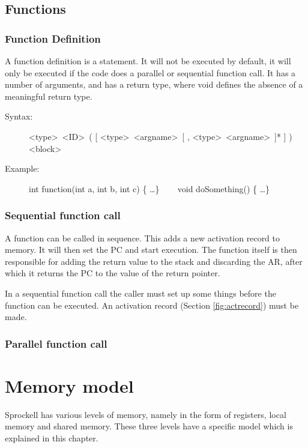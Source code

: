 \documentclass[10pt,a4paper]{report}
\begin{document}
\subsection{Functions} \label{subsec:functions}
\subsubsection{Function Definition}
A function definition is a statement. It will not be executed by default, it will only be executed if the code does a parallel or sequential function call. It has a number of arguments, and has a return type, where void defines the absence of a meaningful return 
type.

\begin{description}
	\item[Syntax:] 
		\textless type\textgreater ~\textless ID\textgreater ~( [ \textless type\textgreater ~\textless argname\textgreater ~[ , \textless type\textgreater ~\textless argname\textgreater ~]* ] ) \textless block\textgreater
	\item[Example:] 
		int function(int a, int b, int c) \{ \ldots \} ~~~
		void doSomething() \{ \ldots \}
\end{description} 



\subsubsection{Sequential function call}
A function can be called in sequence. This adds a new activation record to memory. It will then set the PC and start execution. The function itself is then responsible for adding the return value to the stack and discarding the AR, after which it returns the PC to the value of the return pointer.


In a sequential function call the caller must set up some things before the function can be executed. An activation record (Section \ref{fig:actrecord}) must be made. 



\subsubsection{Parallel function call}






\section{Memory model}
Sprockell has various levels of memory, namely in the form of registers, local memory and shared memory. These three levels have a specific model which is explained in this chapter.
\end{document}
